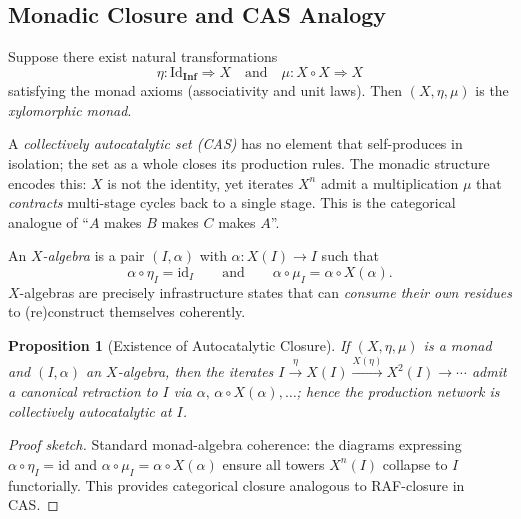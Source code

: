 \documentclass[12pt]{article}
\theoremstyle{plain}
\newtheorem{proposition}{Proposition}
\begin{document}
{{{{{{{{{{{{{{{{\subsection{Monadic Closure and CAS Analogy}

\begin{definition}
Suppose there exist natural transformations
\[
\eta:\mathrm{Id}_{\mathbf{Inf}}\Rightarrow X
\quad\text{and}\quad
\mu: X\!\circ X \Rightarrow X
\]
satisfying the monad axioms (associativity and unit laws). Then $(X,\eta,\mu)$ is the \emph{xylomorphic monad}.
\end{definition}

\begin{remark}
A \emph{collectively autocatalytic set (CAS)} has no element that self-produces in isolation; the set as a whole closes its production rules. The monadic structure encodes this: $X$ is not the identity, yet iterates $X^n$ admit a multiplication $\mu$ that \emph{contracts} multi-stage cycles back to a single stage. This is the categorical analogue of “$A$ makes $B$ makes $C$ makes $A$”.
\end{remark}

\begin{definition}
An \emph{$X$-algebra} is a pair $(I,\alpha)$ with $\alpha: X(I)\to I$ such that
\[
\alpha\circ \eta_I = \mathrm{id}_I
\qquad\text{and}\qquad
\alpha\circ \mu_I = \alpha\circ X(\alpha).
\]
$X$-algebras are precisely infrastructure states that can \emph{consume their own residues} to (re)construct themselves coherently.
\end{definition}

\begin{proposition}[Existence of Autocatalytic Closure]
\label{prop:closure}
If $(X,\eta,\mu)$ is a monad and $(I,\alpha)$ an $X$-algebra, then the iterates $I \xrightarrow{\eta} X(I) \xrightarrow{X(\eta)} X^2(I)\to\cdots$ admit a canonical retraction to $I$ via $\alpha,\,\alpha\circ X(\alpha),\dots$; hence the production network is collectively autocatalytic at $I$.
\end{proposition}

\begin{proof}[Proof sketch]
Standard monad-algebra coherence: the diagrams expressing $\alpha\circ \eta_I=\mathrm{id}$ and $\alpha\circ \mu_I = \alpha\circ X(\alpha)$ ensure all towers $X^n(I)$ collapse to $I$ functorially. This provides categorical closure analogous to RAF-closure in CAS.
\end{proof}

}}}}}}}}}}}}}}}}
\end{document}
